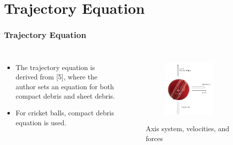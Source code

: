 \documentclass{beamer}
\begin{document}
\section{Trajectory Equation}
\begin{frame}
\frametitle{Trajectory Equation}

\begin{columns}
  \begin{itemize}
  \item The trajectory equation is derived from [5], where the author sets an equation for both compact debris and sheet debris.
  \item For cricket balls, compact debris equation is used.
  
  
  \end{itemize}

\begin{figure}[h!]
  \centering
  \begin{subfigure}[b]{0.6\linewidth}
    \includegraphics[width=\linewidth]{./figs/my_1.png}
  \end{subfigure}

  \caption{Axis system, velocities, and forces}
  \label{fig:axis}
\end{figure}
\end{columns}


\end{frame}
\end{document}
